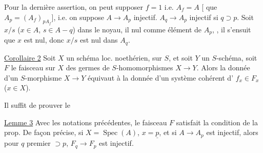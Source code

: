 
Pour la dernière assertion, on peut supposer $f=1$  i.e. $A_f=A$ [  que $A_p=(A_f)_{pA_f}$], i.e. on suppose $A\to A_p$ injectif.  $A_q\to A_p$ injectif si $q\supset p$. Soit $x/s$ ($x\in A$, $s\in A-q$) dans le noyau,  il   nul comme élément de $A_p$,  , il s'ensuit que $x$ est nul, donc $x/s$ est nul dans $A_q$.

\uline{Corollaire 2} Soit $X$ un schéma loc. noethérien,  sur $S$, et soit $Y$ un $S$-schéma, soit $F$ le  faisceau sur $X$ des germes de $S$-homomorphismes $X\to Y$. Alors la donnée d'un $S$-morphisme $X\to Y$ équivaut à la donnée d'un système cohérent d' $f_x\in F_x$ ($x\in X$).

Il suffit de prouver le

\uline{Lemme 3} Avec les notations précédentes, le faisceau $F$ satisfait la condition de la prop.  De façon précise,  si $X=\operatorname{Spec}(A)$, $x=\underline p$, et si $A\to A_p$ est injectif, alors pour  $q$ premier $\supset p$, $F_q\to F_p$ est injectif.
